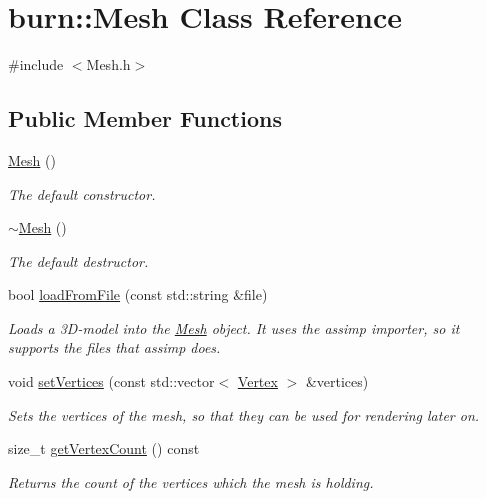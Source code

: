 \hypertarget{classburn_1_1_mesh}{\section{burn\-:\-:Mesh Class Reference}
\label{classburn_1_1_mesh}
}


{\ttfamily \#include $<$Mesh.\-h$>$}

\subsection*{Public Member Functions}
\begin{DoxyCompactItemize}
\item 
\hyperlink{classburn_1_1_mesh_a35d4706a490d0f2bb190b6b785621e07}{Mesh} ()
\begin{DoxyCompactList}\small\item\em The default constructor. \end{DoxyCompactList}\item 
\hyperlink{classburn_1_1_mesh_ad8b2e6283ea14b3943a8945ab7f2d27d}{$\sim$\-Mesh} ()
\begin{DoxyCompactList}\small\item\em The default destructor. \end{DoxyCompactList}\item 
bool \hyperlink{classburn_1_1_mesh_a3179d5730bfcf0e781b1c0daebfc7439}{load\-From\-File} (const std\-::string \&file)
\begin{DoxyCompactList}\small\item\em Loads a 3\-D-\/model into the \hyperlink{classburn_1_1_mesh}{Mesh} object. It uses the assimp importer, so it supports the files that assimp does. \end{DoxyCompactList}\item 
void \hyperlink{classburn_1_1_mesh_ae0996bd5d561cdf7b26e27c713facea7}{set\-Vertices} (const std\-::vector$<$ \hyperlink{classburn_1_1_vertex}{Vertex} $>$ \&vertices)
\begin{DoxyCompactList}\small\item\em Sets the vertices of the mesh, so that they can be used for rendering later on. \end{DoxyCompactList}\item 
size\-\_\-t \hyperlink{classburn_1_1_mesh_a076016c8452ff794880480626394e44c}{get\-Vertex\-Count} () const 
\begin{DoxyCompactList}\small\item\em Returns the count of the vertices which the mesh is holding. \end{DoxyCompactList}\item 

\end{DoxyCompactItemize}

